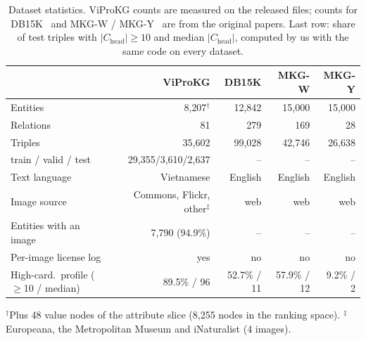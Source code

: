 \begin{table}[t]
\centering
\footnotesize
\caption{Dataset statistics. ViProKG counts are measured on the released files; counts for DB15K~\cite{db15k} and MKG-W / MKG-Y~\cite{mmrns} are from the original papers. Last row: share of test triples with $|C_{\text{head}}| \geq 10$ and median $|C_{\text{head}}|$, computed by us with the same code on every dataset.}
\label{tab:dataset}
\begin{tabular}{l r r r r}
\toprule
 & \textbf{ViProKG} & DB15K & MKG-W & MKG-Y \\
\midrule
Entities & 8{,}207$^{\dagger}$ & 12{,}842 & 15{,}000 & 15{,}000 \\
Relations & 81 & 279 & 169 & 28 \\
Triples & 35{,}602 & 99{,}028 & 42{,}746 & 26{,}638 \\
\quad train / valid / test & 29{,}355/3{,}610/2{,}637 & -- & -- & -- \\
Text language & Vietnamese & English & English & English \\
Image source & Commons, Flickr, other$^{\ddagger}$ & web & web & web \\
Entities with an image & 7{,}790 (94.9\%) & -- & -- & -- \\
Per-image license log & yes & no & no & no \\
High-card.\ profile ($\geq$10 / median) & 89.5\% / 96 & 52.7\% / 11 & 57.9\% / 12 & 9.2\% / 2 \\
\bottomrule
\end{tabular}
\vspace{2pt}
\begin{minipage}{\linewidth}\footnotesize\raggedright
$^{\dagger}$Plus 48 value nodes of the attribute slice (8{,}255 nodes in the ranking space). $^{\ddagger}$Europeana, the Metropolitan Museum and iNaturalist (4 images).
\end{minipage}
\end{table}
